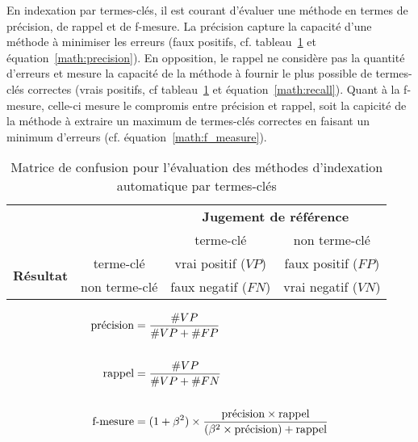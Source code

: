     En indexation par termes-clés, il est courant d'évaluer une méthode en
    termes de précision, de rappel et de f-mesure. La précision capture la
    capacité d'une méthode à minimiser les erreurs (faux positifs, cf.
    tableau~\ref{tab:confusion_matrix} et équation~\ref{math:precision}). En
    opposition, le rappel ne considère pas la quantité d'erreurs et mesure la
    capacité de la méthode à fournir le plus possible de termes-clés correctes
    (vrais positifs, cf tableau~\ref{tab:confusion_matrix} et
    équation~\ref{math:recall}). Quant à la f-mesure, celle-ci mesure le
    compromis entre précision et rappel, soit la capicité de la méthode à
    extraire un maximum de termes-clés correctes en faisant un minimum d'erreurs
    (cf. équation~\ref{math:f_measure}).
    \begin{table}
      \begin{center}
        \begin{tabular}{cc|cc}
          \toprule
          \multicolumn{2}{c|}{} & \multicolumn{2}{c}{\textbf{Jugement de référence}}\\
          \multicolumn{2}{c|}{} & \og{}terme-clé\fg{} & \og{}non terme-clé\fg{}\\
          \hline
          \multirow{2}{*}{\textbf{Résultat}} & \og{}terme-clé\fg{} & vrai positif ($VP$) & faux positif ($FP$)\\
          & \og{}non terme-clé\fg{} & faux negatif ($FN$) & vrai negatif ($VN$)\\
          \bottomrule
        \end{tabular}
        \caption{Matrice de confusion pour l'évaluation des méthodes
                 d'indexation automatique par termes-clés
                \label{tab:confusion_matrix}}
      \end{center}
    \end{table}
    \begin{align}
      \text{précision} &= \frac{\#VP}{\#VP + \#FP} \label{math:precision}\\
      \notag\\
      \text{rappel} &= \frac{\#VP}{\#VP + \#FN} \label{math:recall}\\
      \notag\\
      \text{f-mesure} &= (1 + \beta^2) \times \frac{\text{précision} \times \text{rappel}}{(\beta^2 \times \text{précision}) + \text{rappel}} \label{math:f_measure}
    \end{align}
      
